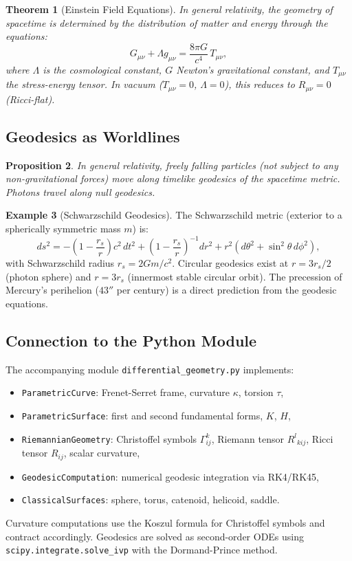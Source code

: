 \documentclass[12pt,a4paper]{amsart}
\newtheorem{theorem}{Theorem}[section]
\newtheorem{proposition}[theorem]{Proposition}
\theoremstyle{definition}
\newtheorem{example}[theorem]{Example}
\begin{document}
\begin{theorem}[Einstein Field Equations]
In general relativity, the geometry of spacetime is determined by the
distribution of matter and energy through the equations:
\[
  G_{\mu\nu} + \Lambda g_{\mu\nu} = \frac{8\pi G}{c^4}\,T_{\mu\nu},
\]
where $\Lambda$ is the cosmological constant, $G$ Newton's gravitational
constant, and $T_{\mu\nu}$ the stress-energy tensor. In vacuum ($T_{\mu\nu} = 0$,
$\Lambda = 0$), this reduces to $R_{\mu\nu} = 0$ (\emph{Ricci-flat}).
\end{theorem}

\subsection{Geodesics as Worldlines}

\begin{proposition}
In general relativity, freely falling particles (not subject to any non-gravitational
forces) move along \emph{timelike geodesics} of the spacetime metric. Photons
travel along \emph{null geodesics}.
\end{proposition}

\begin{example}[Schwarzschild Geodesics]
The Schwarzschild metric (exterior to a spherically symmetric mass $m$) is:
\[
  ds^2 = -\left(1 - \frac{r_s}{r}\right)c^2\,dt^2
  + \left(1 - \frac{r_s}{r}\right)^{-1}dr^2
  + r^2(d\theta^2 + \sin^2\!\theta\,d\phi^2),
\]
with Schwarzschild radius $r_s = 2Gm/c^2$. Circular geodesics exist at
$r = 3r_s/2$ (photon sphere) and $r = 3r_s$ (innermost stable circular orbit).
The precession of Mercury's perihelion ($43''$ per century) is a direct
prediction from the geodesic equations.
\end{example}

\subsection{Connection to the Python Module}

The accompanying module \texttt{differential\_geometry.py} implements:
\begin{itemize}
  \item \texttt{ParametricCurve}: Frenet-Serret frame, curvature $\kappa$, torsion $\tau$,
  \item \texttt{ParametricSurface}: first and second fundamental forms, $K$, $H$,
  \item \texttt{RiemannianGeometry}: Christoffel symbols $\Gamma^k_{ij}$,
        Riemann tensor $R^l{}_{kij}$, Ricci tensor $R_{ij}$, scalar curvature,
  \item \texttt{GeodesicComputation}: numerical geodesic integration via RK4/RK45,
  \item \texttt{ClassicalSurfaces}: sphere, torus, catenoid, helicoid, saddle.
\end{itemize}
Curvature computations use the Koszul formula for Christoffel symbols and
contract accordingly. Geodesics are solved as second-order ODEs using
\texttt{scipy.integrate.solve\_ivp} with the Dormand-Prince method.
\end{document}
